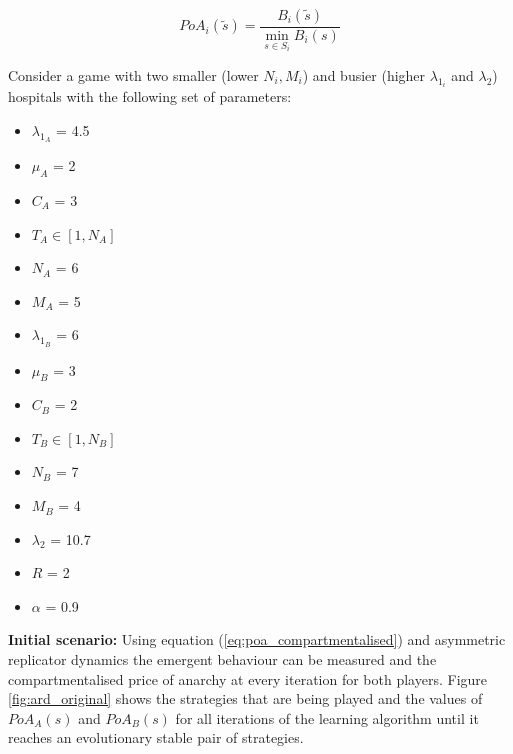 \begin{equation}\label{eq:poa_compartmentalised}
    PoA_{i}(\tilde{s}) = \frac{B_i(\tilde{s})}{\min_{s \in S_i} B_i(s)}
\end{equation}

Consider a game with two smaller (lower \( N_i, M_i \)) and busier (higher 
\(\lambda_{1_i} \) and \(\lambda_2\)) hospitals with the following set of 
parameters:

\begin{multicols}{3}
    \begin{itemize}        
        \item \( \lambda_{1_A} \) = 4.5
        \item \( \mu_A \) = 2
        \item \( C_A \) = 3
        \item \( T_A \in [1, N_A] \) 
        \item \( N_A \) = 6
        \item \( M_A \) = 5

        \columnbreak
        \item \( \lambda_{1_B} \) = 6
        \item \( \mu_B \) = 3
        \item \( C_B \) = 2
        \item \( T_B \in [1, N_B] \)
        \item \( N_B \) = 7
        \item \( M_B \) = 4
        
        \columnbreak
        \item \( \lambda_2 \) = 10.7
        \item \( R \) = 2
        \item \( \alpha \) = 0.9
    \end{itemize}
\end{multicols}

\textbf{Initial scenario:}
Using equation (\ref{eq:poa_compartmentalised}) and asymmetric replicator 
dynamics the emergent behaviour can be measured and the compartmentalised price 
of anarchy at every iteration for both players.
Figure \ref{fig:ard_original} shows the strategies that are being played and 
the values of \(PoA_A(s)\) and \(PoA_B(s)\) for all iterations of the 
learning algorithm until it reaches an evolutionary stable pair of strategies.

